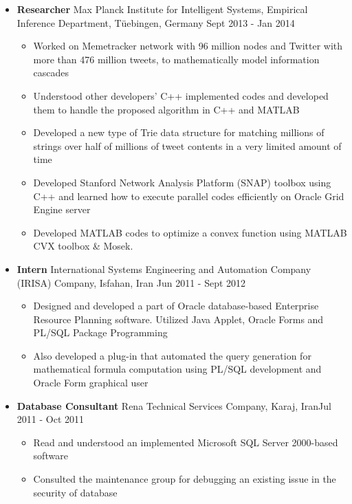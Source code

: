 \documentclass[letter]{res}
\begin{document}
\begin{resume}
\begin{itemize}[leftmargin=-.1in]
			\item \textbf{Researcher} \newline
			Max Planck Institute for Intelligent Systems, Empirical Inference Department, Tüebingen, Germany \hfill {\footnotesize Sept 2013 - Jan 2014}\\
			\vspace{-4mm}
			\iflong
			\begin{itemize}
				\item Worked on Memetracker network with 96 million nodes and Twitter with more than 476 million tweets, to mathematically model information cascades
				\item Understood other developers' C++ implemented codes and developed them to handle the proposed algorithm in C++ and MATLAB
				\item Developed a new type of Trie data structure for matching millions of strings over half of millions of tweet contents in a very limited amount of time
				\item Developed Stanford Network Analysis Platform (SNAP) toolbox using C++ and learned how to execute parallel codes efficiently on Oracle Grid Engine server
				\item Developed MATLAB codes to optimize a convex function using MATLAB CVX toolbox \& Mosek.
			\end{itemize}
			\fi
			
			\item \textbf{Intern} \newline
			International Systems Engineering and Automation Company (IRISA) Company, Isfahan, Iran \hfill Jun 2011 - Sept 2012\\
			\vspace{-4mm}
			\iflong
			\begin{itemize}
				\item Designed and developed a part of Oracle database-based Enterprise Resource Planning software. Utilized Java Applet, Oracle Forms and PL/SQL Package Programming
				\item Also developed a plug-in that automated the query generation for mathematical formula computation using PL/SQL development and Oracle Form graphical user
			\end{itemize}
			\fi
			
			\item \textbf{Database Consultant}
			\newline
			Rena Technical Services Company, Karaj, Iran\hfill Jul 2011 - Oct 2011\\
			\vspace{-4mm}
			\iflong
			\begin{itemize}
				\item Read and understood an implemented Microsoft SQL Server 2000-based software
				\item Consulted the maintenance group for debugging an existing issue in the security of database
			\end{itemize}
		\end{itemize}
		

\end{resume}
\end{document}
